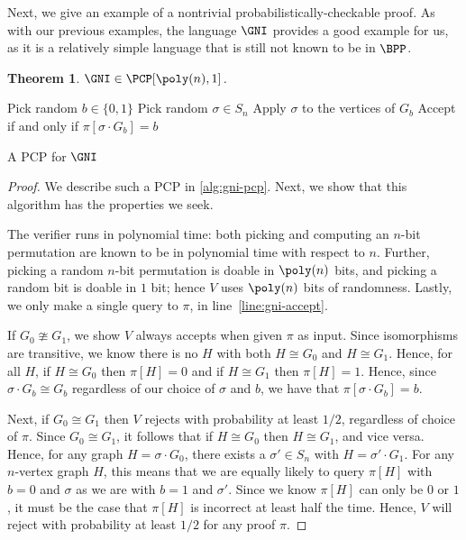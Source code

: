 \documentclass[english,12pt]{reedthesis}
\theoremstyle{plain}
\newtheorem{thm}{Theorem}[section]
\theoremstyle{definition}
\theoremstyle{remark}
\begin{document}
Next, we give an example of a nontrivial probabilistically-checkable proof. As
with our previous examples, the language $\GNI$ provides a good example for us,
as it is a relatively simple language that is still not known to be in $\BPP$.

\begin{thm}\label{thm:gni-pcp}
  $\GNI \in \PCP[\poly(n), 1]$.
\end{thm}

\begin{algorithm}[htbp]
  \KwRet{$\pi$}\;
  Pick random $b \in \{0, 1\}$\;
  Pick random $\sigma \in S_{n}$\;
  Apply $\sigma$ to the vertices of $G_{b}$\;
  Accept if and only if $\pi[\sigma \cdot G_{b}] = b$\;
  \caption{A PCP for $\GNI$}\label{alg:gni-pcp}
\end{algorithm}

\begin{proof}
  We describe such a PCP in \cref{alg:gni-pcp}. Next, we show that this
  algorithm has the properties we seek.

  The verifier runs in polynomial time: both picking and computing an $n$-bit
  permutation are known to be in polynomial time with respect to $n$. Further,
  picking a random $n$-bit permutation is doable in $\poly(n)$ bits, and picking
  a random bit is doable in $1$ bit; hence $V$ uses $\poly(n)$ bits of
  randomness. Lastly, we only make a single query to $\pi$, in
  line~\ref{line:gni-accept}.

  If $G_{0} \ncong G_{1}$, we show $V$ always accepts when given $\pi$ as input. Since
  isomorphisms are transitive, we know there is no $H$ with both $H \cong G_{0}$ and
  $H \cong G_{1}$. Hence, for all $H$, if $H \cong G_{0}$ then $\pi[H] = 0$ and if
  $H \cong G_{1}$ then $\pi[H] = 1$. Hence, since $\sigma \cdot G_{b} \cong G_{b}$ regardless of
  our choice of $\sigma$ and $b$, we have that $\pi[\sigma \cdot G_{b}] = b$.

  Next, if $G_{0} \cong G_{1}$ then $V$ rejects with probability at least $1/2$,
  regardless of choice of $\pi$. Since $G_{0} \cong G_{1}$, it follows that if
  $H \cong G_{0}$ then $H \cong G_{1}$, and vice versa. Hence, for any graph
  $H = \sigma \cdot G_{0}$, there exists a $\sigma' \in S_{n}$ with $H = \sigma' \cdot G_{1}$. For any
  $n$-vertex graph $H$, this means that we are equally likely to query $\pi[H]$
  with $b = 0$ and $\sigma$ as we are with $b = 1$ and $\sigma'$. Since we know $\pi[H]$ can
  only be $0$ or $1$, it must be the case that $\pi[H]$ is incorrect at least half
  the time. Hence, $V$ will reject with probability at least $1/2$ for any proof
  $\pi$.
\end{proof}
\end{document}
